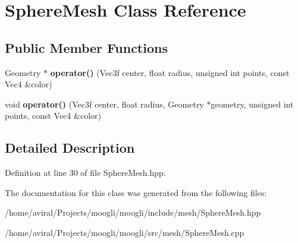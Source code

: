 \hypertarget{classSphereMesh}{\section{Sphere\-Mesh Class Reference}
\label{classSphereMesh}
}
\subsection*{Public Member Functions}
\begin{DoxyCompactItemize}
\item 
\hypertarget{classSphereMesh_ac2f74a159e2c440e570fcc96eccd3bc7}{Geometry $\ast$ {\bfseries operator()} (Vec3f center, float radius, unsigned int points, const Vec4 \&color)}\label{classSphereMesh_ac2f74a159e2c440e570fcc96eccd3bc7}

\item 
\hypertarget{classSphereMesh_a8b27a3b7b6bfbe78ef36f10b45be3674}{void {\bfseries operator()} (Vec3f center, float radius, Geometry $\ast$geometry, unsigned int points, const Vec4 \&color)}\label{classSphereMesh_a8b27a3b7b6bfbe78ef36f10b45be3674}

\end{DoxyCompactItemize}


\subsection{Detailed Description}


Definition at line 30 of file Sphere\-Mesh.\-hpp.



The documentation for this class was generated from the following files\-:\begin{DoxyCompactItemize}
\item 
/home/aviral/\-Projects/moogli/moogli/include/mesh/Sphere\-Mesh.\-hpp\item 
/home/aviral/\-Projects/moogli/moogli/src/mesh/Sphere\-Mesh.\-cpp\end{DoxyCompactItemize}
